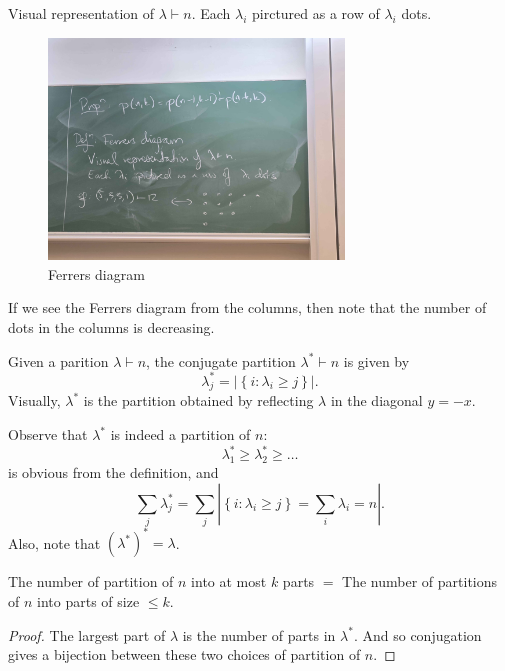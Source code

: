 \begin{definition}
    Visual representation of \(\lambda \vdash n\). Each \(\lambda _i\) pirctured as a row of \(\lambda _i\) dots.    
\end{definition}
\begin{figure}[H]
    \centering
    \includegraphics[width=0.7\textwidth]{./Figures/20250923_153141.jpg}
    \caption{Ferrers diagram}
    \label{fig:Ferrers}
\end{figure}

\begin{note}
    If we see the Ferrers diagram from the columns, then note that the number of dots in the columns is decreasing.
\end{note}

\begin{definition}
    Given a parition \(\lambda \vdash n\), the conjugate partition \(\lambda ^* \vdash n\) is given by 
    \[
        \lambda _j^* = \left\vert \left\{ i: \lambda _i \ge j \right\}  \right\vert. 
    \] 
    Visually, \(\lambda ^*\) is the partition obtained by reflecting \(\lambda  \) in the diagonal \(y = -x\).     
\end{definition}

Observe that \(\lambda ^*\) is indeed a partition of \(n\):
\[
    \lambda _1^* \ge \lambda _2^* \ge \dots 
\] is obvious from the definition, and 
\[
    \sum_{j} \lambda_j ^* = \sum_{j} \left\vert \left\{ i: \lambda _i \ge j \right\} = \sum_{i} \lambda _i = n   \right\vert.   
\]
Also, note that \(\left( \lambda ^* \right)^* = \lambda \). 

\begin{proposition}
    The number of partition of \(n\) into at most \(k\) parts \(=\) The number of partitions of \(n\) into parts of size \(\le k\).     
\end{proposition}
\begin{proof}
    The largest part of \(\lambda \) is the number of parts in \(\lambda ^*\). And so conjugation gives a bijection between these two choices of partition of \(n\).   
\end{proof}

